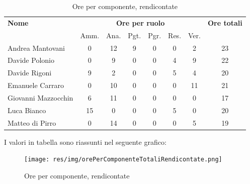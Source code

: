     \begin{table}[H]
    \begin{tabular}{lccccccc}
    \toprule
        \textbf{Nome}  & \multicolumn{6}{c}{\textbf{Ore per ruolo}} & \textbf{Ore totali} \\
         & Amm. & Ana. & Pgt. & Pgr. & Res. & Ver. & \\
        \midrule
        
    	Andrea Mantovani & 0 & 12 & 9 & 0 & 0 & 2 & 23 \\
    	Davide Polonio & 0 & 9 & 0 & 0 & 4 & 9 & 22 \\
    	Davide Rigoni & 9 & 2 & 0 & 0 & 5 & 4 & 20 \\
    	Emanuele Carraro & 0 & 10 & 0 & 0 & 0 & 11 & 21 \\
    	Giovanni Mazzocchin & 6 & 11 & 0 & 0 & 0 & 0 & 17 \\
    	Luca Bianco & 15 & 0 & 0 & 0 & 5 & 0 & 20 \\
    	Matteo di Pirro & 0 & 14 & 0 & 0 & 0 & 5 & 19 \\
        
        \bottomrule
    \end{tabular}
    \caption{Ore per componente, rendicontate}
    \end{table}
    
    I valori in tabella sono riassunti nel seguente grafico: \\ 
    
        \begin{figure}[H]
          \begin{center}
            \texttt{[image: res/img/orePerComponenteTotaliRendicontate.png]}
          \caption{Ore per componente, rendicontate}
          \end{center} 
        \end{figure}   
    

